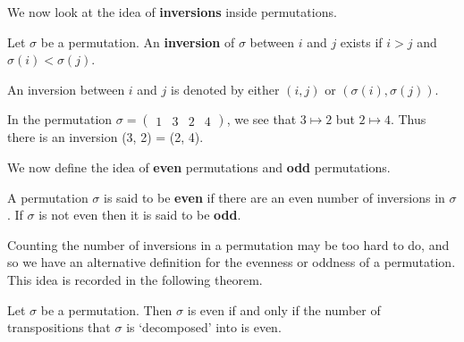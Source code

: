 We now look at the idea of \textbf{inversions} inside permutations.
\begin{definition}
    Let $\sigma$ be a permutation. An \textbf{inversion} of $\sigma$ between $i$ and $j$ exists if $i > j$ and $\sigma(i) < \sigma(j)$.
\end{definition}
An inversion between $i$ and $j$ is denoted by either $(i, j)$ or $(\sigma(i), \sigma(j))$.
\begin{example}
    In the permutation $\sigma = \begin{pmatrix}1 & 3 & 2 & 4\end{pmatrix}$, we see that $3 \mapsto 2$ but $2 \mapsto 4$. Thus there is an inversion (3, 2) = (2, 4).
\end{example}

We now define the idea of \textbf{even} permutations and \textbf{odd} permutations.
\begin{definition}
    A permutation $\sigma$ is said to be \textbf{even} if there are an even number of inversions in $\sigma$. If $\sigma$ is not even then it is said to be \textbf{odd}.
\end{definition}

Counting the number of inversions in a permutation may be too hard to do, and so we have an alternative definition for the evenness or oddness of a permutation. This idea is recorded in the following theorem.

\begin{theorem}\label{thrm-parity-of-permutation}
    Let $\sigma$ be a permutation. Then $\sigma$ is even if and only if the number of transpositions that $\sigma$ is `decomposed' into is even.
\end{theorem}

